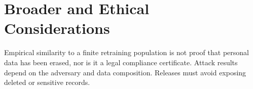 \section{Broader and Ethical Considerations}
Empirical similarity to a finite retraining population is not proof that personal data
has been erased, nor is it a legal compliance certificate. Attack results depend on the
adversary and data composition. Releases must avoid exposing deleted or sensitive records.

